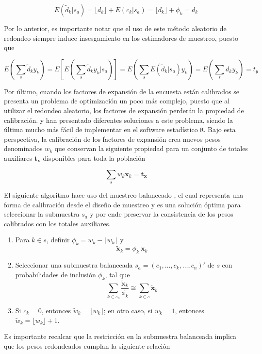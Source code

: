 \documentclass[
  12pt,
]{book}
\begin{document}
\[
E(\tilde d_k | s_a) 
= \lfloor d_k \rfloor + E(c_k|s_a) 
= \lfloor d_k \rfloor + \phi_k
= d_k
\]

Por lo anterior, es importante notar que el uso de este método aleatorio de redondeo siempre induce insesgamiento en los estimadores de muestreo, puesto que

\[
E \left( \sum_s \tilde d_k y_k \right) 
= E \left[ E \left( \sum_s \tilde d_k y_k  | s_a\right)  \right] 
= E \left( \sum_s E(\tilde d_k | s_a) y_k \right) 
= E \left( \sum_s d_k y_k \right) = t_y
\]

Por último, cuando los factores de expansión de la encuesta están calibrados se presenta un problema de optimización un poco más complejo, puesto que al utilizar el redondeo aleatorio, los factores de expansión perderán la propiedad de calibración. \citet{Sartore_Toppin_Young_Spiegelman_2019} y \citet{Tille} han presentado diferentes soluciones a este problema, siendo la última mucho más fácil de implementar en el software estadístico \texttt{R}. Bajo esta perspectiva, la calibración de los factores de expansión crea nuevos pesos denominados \(w_k\) que conservan la siguiente propiedad para un conjunto de totales auxiliares \(\mathbf{t_x}\) disponibles para toda la población

\[
\sum_s w_k \mathbf{x}_k =  \mathbf{t_x}
\]

El siguiente algoritmo hace uso del muestreo balanceado \citep[capítulo 8]{Tille_2006}, el cual representa una forma de calibración desde el diseño de muestreo y es una solución óptima para seleccionar la submuestra \(s_a\) y por ende preservar la consistencia de los pesos calibrados con los totales auxiliares.

\begin{enumerate}
\def\labelenumi{\arabic{enumi}.}
\item
  Para \(k \in s\), definir \(\phi_k = w_k - \lfloor w_k \rfloor\) y
  \[
  \tilde{\mathbf{x}}_k = \phi_k \ \mathbf{x}_k
  \]
\item
  Seleccionar una submuestra balanceada \(s_a=(c_1,\ldots,c_k,\ldots,c_n)'\) de \(s\) con probabilidades de inclusión \(\phi_k\), tal que
  \[
  \sum_{k \in s_a} \frac{\tilde{\mathbf{x}}_k}{\phi_k} 
  \cong
  \sum_{k \in s} \tilde{\mathbf{x}}_k
  \]
\item
  Si \(c_k = 0\), entonces \(\tilde w_k = \lfloor w_k \rfloor\); en otro caso, si \(w_k = 1\), entonces \(\tilde w_k = \lfloor w_k \rfloor + 1\).
\end{enumerate}

Es importante recalcar que la restricción en la submuestra balanceada implica que los pesos redondeados cumplan la siguiente relación
\end{document}
